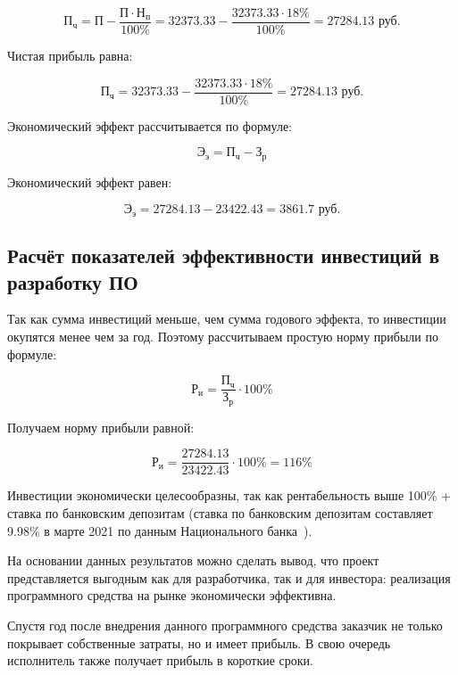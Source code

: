 \begin{equation}
    \textit{П}_\textit{ч} = \textit{П} - \frac{\textit{П} \cdot \textit{Н}_\textit{п}}{100\%} = 32373.33 - \frac{32373.33 \cdot 18\%}{100\%} = 27284.13 \textrm{ руб.}
\end{equation}

Чистая прибыль равна:

\begin{equation*}
    \textit{П}_\textit{ч} = 32373.33 - \frac{32373.33 \cdot 18\%}{100\%} = 27284.13 \textrm{ руб.}
\end{equation*}

Экономический эффект рассчитывается по формуле:

\begin{equation}
    \textit{Э}_\textit{э} = \textit{П}_\textit{ч} - \textit{З}_\textit{р}
\end{equation}

Экономический эффект равен:

\begin{equation*}
    \textit{Э}_\textit{э} = 27284.13 - 23422.43 = 3861.7 \textrm{ руб.}
\end{equation*}

\subsection{Расчёт показателей эффективности инвестиций в разработку ПО}

Так как сумма инвестиций меньше, чем сумма годового эффекта, то инвестиции окупятся менее чем за год. Поэтому рассчитываем простую норму прибыли по формуле:

\begin{equation}
    \textit{Р}_\textit{и} = \frac{\textit{П}_\textit{ч}}{\textit{З}_\textit{р}} \cdot 100\%
\end{equation}

Получаем норму прибыли равной:

\begin{equation*}
    \textit{Р}_\textit{и} = \frac{27284.13}{23422.43} \cdot 100\% = 116\%
\end{equation*}

Инвестиции экономически целесообразны, так как рентабельность выше 100\% + ставка по банковским депозитам (ставка по банковским депозитам  составляет 9.98\% в марте 2021 по данным Национального банка~\cite{nbrb}).

На основании данных результатов можно сделать вывод, что проект представляется выгодным как для разработчика, так и для инвестора: реализация программного средства на рынке экономически эффективна.

Спустя год после внедрения данного программного средства заказчик не только покрывает собственные затраты, но и имеет прибыль. В свою очередь исполнитель также получает прибыль в короткие сроки.
